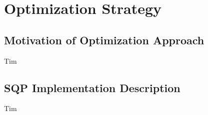 \section{Optimization Strategy}

\subsection{Motivation of Optimization Approach}
Tim
\subsection{SQP Implementation Description}
Tim

